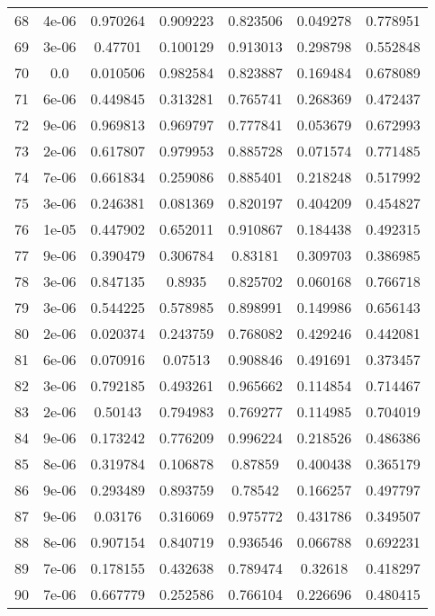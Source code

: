 \begin{table}
\begin{tabular*}{\linewidth}{c|c|c|c|c|c|c}
68 & 4e-06 & 0.970264 & 0.909223 & 0.823506 & 0.049278 & 0.778951\\
69 & 3e-06 & 0.47701 & 0.100129 & 0.913013 & 0.298798 & 0.552848\\
70 & 0.0 & 0.010506 & 0.982584 & 0.823887 & 0.169484 & 0.678089\\
71 & 6e-06 & 0.449845 & 0.313281 & 0.765741 & 0.268369 & 0.472437\\
72 & 9e-06 & 0.969813 & 0.969797 & 0.777841 & 0.053679 & 0.672993\\
73 & 2e-06 & 0.617807 & 0.979953 & 0.885728 & 0.071574 & 0.771485\\
74 & 7e-06 & 0.661834 & 0.259086 & 0.885401 & 0.218248 & 0.517992\\
75 & 3e-06 & 0.246381 & 0.081369 & 0.820197 & 0.404209 & 0.454827\\
76 & 1e-05 & 0.447902 & 0.652011 & 0.910867 & 0.184438 & 0.492315\\
77 & 9e-06 & 0.390479 & 0.306784 & 0.83181 & 0.309703 & 0.386985\\
78 & 3e-06 & 0.847135 & 0.8935 & 0.825702 & 0.060168 & 0.766718\\
79 & 3e-06 & 0.544225 & 0.578985 & 0.898991 & 0.149986 & 0.656143\\
80 & 2e-06 & 0.020374 & 0.243759 & 0.768082 & 0.429246 & 0.442081\\
81 & 6e-06 & 0.070916 & 0.07513 & 0.908846 & 0.491691 & 0.373457\\
82 & 3e-06 & 0.792185 & 0.493261 & 0.965662 & 0.114854 & 0.714467\\
83 & 2e-06 & 0.50143 & 0.794983 & 0.769277 & 0.114985 & 0.704019\\
84 & 9e-06 & 0.173242 & 0.776209 & 0.996224 & 0.218526 & 0.486386\\
85 & 8e-06 & 0.319784 & 0.106878 & 0.87859 & 0.400438 & 0.365179\\
86 & 9e-06 & 0.293489 & 0.893759 & 0.78542 & 0.166257 & 0.497797\\
87 & 9e-06 & 0.03176 & 0.316069 & 0.975772 & 0.431786 & 0.349507\\
88 & 8e-06 & 0.907154 & 0.840719 & 0.936546 & 0.066788 & 0.692231\\
89 & 7e-06 & 0.178155 & 0.432638 & 0.789474 & 0.32618 & 0.418297\\
90 & 7e-06 & 0.667779 & 0.252586 & 0.766104 & 0.226696 & 0.480415\\
\end{tabular*}
\end{table}
\newpage
